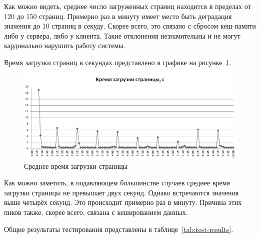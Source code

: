 Как можно видеть, среднее число загруженных страниц находится в пределах от 120 до 150 страниц.
Примерно раз в минуту имеет место быть деградация значения до 10 страниц в секуду.
Скорее всего, это связано с сбросом кеш-памяти либо у сервера, либо у клиента.
Такие отклонения незначительны и не могут кардинально нарушить работу системы.

Время загрузки страниц в секундах представлено в графике на рисунке~\ref{img:test-loadingtime}.

\begin{figure}[h!]
	\begin{center}
		\begin{minipage}[h]{\linewidth}
			\includegraphics[width=\linewidth]{images/test-loadingtime.png}
			\caption{Среднее время загрузки страницы}
			\label{img:test-loadingtime}
		\end{minipage}
		\hfill
	\end{center}
\end{figure}

Как можно заметить, в подавляющем большинстве случаев среднее время загрузки страницы не превышает двух секунд.
Однако встречаются значения выше четырёх секунд.
Это происходит примерно раз в минуту.
Причина этих пиков также, скорее всего, связана с кешированием данных.

Общие результаты тестирования представлены в таблице~\ref{tab:test-results}.

